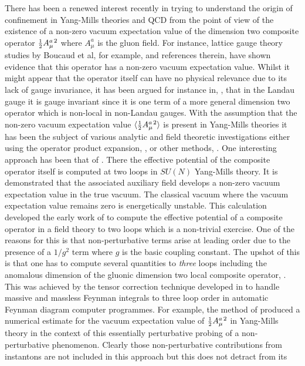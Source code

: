 \documentclass[a4paper,11pt]{article}
\newcommand{\half}{\mbox{\small{$\frac{1}{2}$}}}
\begin{document}
\newpage 
There has been a renewed interest recently in trying to understand the origin 
of confinement in Yang-Mills theories and QCD from the point of view of the
existence of a non-zero vacuum expectation value of the dimension two composite
operator $\half A^{a \, 2}_\mu$ where $A^a_\mu$ is the gluon field. For 
instance, lattice gauge theory studies by Boucaud et al, for example, \cite{1}
and references therein, have shown evidence that this operator has a non-zero 
vacuum expectation value. Whilst it might appear that the operator itself can 
have no physical relevance due to its lack of gauge invariance, it has been 
argued for instance in, \cite{2}, that in the Landau gauge it is gauge 
invariant since it is one term of a more general dimension two operator which 
is non-local in non-Landau gauges. With the assumption that the non-zero vacuum 
expectation value $\langle \half A^{a \, 2}_\mu \rangle$ is present in 
Yang-Mills theories it has been the subject of various analytic and field 
theoretic investigations either using the operator product expansion, 
\cite{3,4,5}, or other methods, \cite{2,6,7,8,9,10,11,12,13}. One interesting
approach has been that of \cite{2}. There the effective potential of the 
composite operator itself is computed at two loops in $SU(N)$ Yang-Mills 
theory. It is demonstrated that the associated auxiliary field develops a 
non-zero vacuum expectation value in the true vacuum. The classical vacuum
where the vacuum expectation value remains zero is energetically unstable. This
calculation developed the early work of \cite{14,15} to compute the effective
potential of a composite operator in a field theory to two loops which is a 
non-trivial exercise. One of the reasons for this is that non-perturbative 
terms arise at leading order due to the presence of a $1/g^2$ term where $g$ is
the basic coupling constant. The upshot of this is that one has to compute 
several quantities to {\em three} loops including the anomalous dimension of 
the gluonic dimension two local composite operator, \cite{2}. This was achieved
by the tensor correction technique developed in \cite{16} to handle massive and 
massless Feynman integrals to three loop order in automatic Feynman diagram 
computer programmes. For example, the method of \cite{2} produced a numerical 
estimate for the vacuum expectation value of $\half A^{a \, 2}_\mu$ in 
Yang-Mills theory in the context of this essentially perturbative probing of a 
non-perturbative phenomenon. Clearly those non-perturbative contributions from 
instantons are not included in this approach but this does not detract from its
\end{document}
